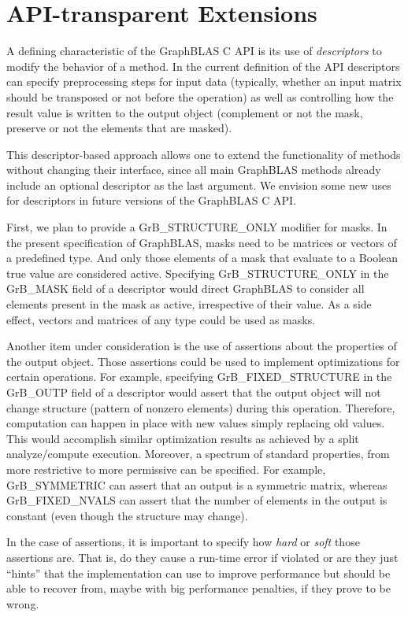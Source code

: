 \section{API-transparent Extensions}
\label{Sec:Extensions}

A defining characteristic of the GraphBLAS C API is its use of
\emph{descriptors} to modify the behavior of a method.  In the current
definition of the API descriptors can specify preprocessing steps for
input data (typically, whether an input matrix should be transposed or
not before the operation) as well as controlling how the result value
is written to the output object (complement or not the mask, preserve
or not the elements that are masked).

This descriptor-based approach allows one to extend the functionality of
methods without changing their interface, since all main GraphBLAS methods
already include an optional descriptor as the last argument. We envision
some new uses for descriptors in future versions of the GraphBLAS C API.

First, we plan to provide a {\sf GrB\_STRUCTURE\_ONLY} modifier for masks.
In the present specification of GraphBLAS, masks need to be matrices
or vectors of a predefined type. And only those elements of a mask
that evaluate to a Boolean {\sf true} value are considered active.
Specifying {\sf GrB\_STRUCTURE\_ONLY} in the {\sf GrB\_MASK} field of
a descriptor would direct GraphBLAS to consider all elements present
in the mask as active, irrespective of their value.  As a side effect,
vectors and matrices of any type could be used as masks.

Another item under consideration is the use of assertions about the
properties of the output object. Those assertions could be used to
implement optimizations for certain operations. For example, specifying
{\sf GrB\_FIXED\_STRUCTURE} in the {\sf GrB\_OUTP} field of a descriptor
would assert that the output object will not change structure (pattern
of nonzero elements) during this operation. Therefore, computation
can happen in place with new values simply replacing old values. This
would accomplish similar optimization results as achieved by a split
analyze/compute execution. Moreover, a spectrum of standard properties,
from more restrictive to more permissive can be specified. For example,
{\sf GrB\_SYMMETRIC} can assert that an output is a symmetric matrix,
whereas {\sf GrB\_FIXED\_NVALS} can assert that the number of elements
in the output is constant (even though the structure may change).

In the case of assertions, it is important to specify how \emph{hard}
or \emph{soft} those assertions are. That is, do they cause a run-time
error if violated or are they just ``hints'' that the implementation
can use to improve performance but should be able to recover from,
maybe with big performance penalties, if they prove to be wrong.
